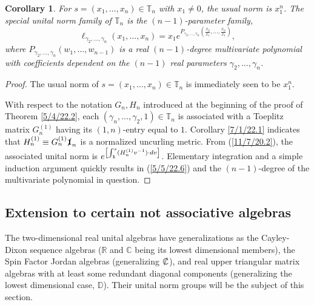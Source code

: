 \documentclass{amsart}
\numberwithin{equation}{section}
\newtheorem{corollary}[theorem]{Corollary}
\theoremstyle{definition}
\numberwithin{theorem}{section}
\begin{document}
\begin{corollary}\label{5/17/22.1} For $s= (x_1,\dots,x_n)\in \mathbb{T}_n$ with $x_1\ne 0$, the usual norm is $x_1^n$.  The special unital norm family of $\mathbb{T}_n$ is the $(n-1)$-parameter family,
\begin{equation} \label{5/5/22.6} \ell_{\gamma_2,\dots,\gamma_n}(x_1,\dots,x_n) = x_1 e^{P_{\gamma_2,\dots,\gamma_n}\left(\frac{x_2}{x_1},\dots,\frac{x_n}{x_1}\right)},\end{equation} where $P_{\gamma_2,\dots,\gamma_n}(w_1,\dots,w_{n-1})$ is a real $(n-1)$-degree multivariate polynomial with coefficients dependent on the $(n-1)$ real parameters $\gamma_2,\dots,\gamma_n$.    \end{corollary}

\begin{proof} The usual norm of $s=(x_1,\dots,x_n)\in \mathbb{T}_n$ is immediately seen to be $x_1^n$.

With respect to the notation $G_n,H_n$ introduced at the beginning of the proof of Theorem \ref{5/4/22.2}, each $(\gamma_n,\dots,\gamma_2,1)\in\mathbb{T}_n$ is associated with a Toeplitz matrix $G_n^{(1)}$ having its $(1,n)$-entry equal to $1$.  Corollary \ref{7/1/22.1} indicates that $H^{(1)}_n\equiv G_n^{(1)}\slashed{\bf 1}_n$ is a normalized uncurling metric. From (\ref{11/7/20.2}),  the associated unital norm is $e^{\left[\int_{\bf 1}^s (H_n^{(1)} v^{-1})\cdot dv\right]}$.  Elementary integration and a simple induction argument quickly results in (\ref{5/5/22.6}) and the $(n-1)$-degree of the multivariate polynomial in question.
\end{proof}
 
\subsection{Extension to certain not associative algebras}
The two-dimensional real unital algebras have generalizations as the Cayley-Dixon sequence algebras ($\mathbb{R}$ and $\mathbb{C}$ being its lowest dimensional members),  the Spin Factor Jordan algebras (generalizing $\slashed{\mathbb{C}}$), and real upper triangular matrix algebras with at least some redundant diagonal components (generalizing the lowest dimensional case, $\mathbb{D}$).  Their unital norm groups will be the subject of this section. 
\end{document}
